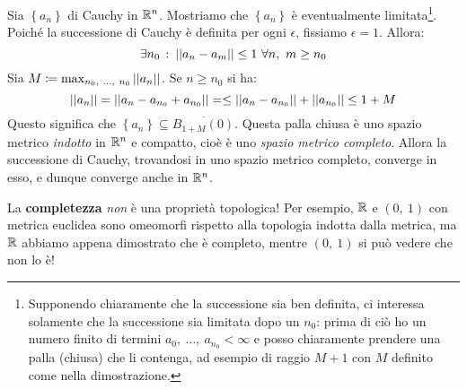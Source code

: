 \begin{demonstration}
	Sia $\left\{a_n\right\}$ di Cauchy in $\mathbb{R}^n$. Mostriamo che $\left\{a_n\right\}$ è eventualmente limitata\footnote{Supponendo chiaramente che la successione sia ben definita, ci interessa solamente che la successione sia limitata dopo un $n_0$: prima di ciò ho un numero finito di termini $a_0,\ \ldots,\ a_{n_0}<\infty$ e posso chiaramente prendere una palla (chiusa) che li contenga, ad esempio di raggio $M+1$ con $M$ definito come nella dimostrazione.}.\\
	Poiché la successione di Cauchy è definita per ogni $\epsilon$, fissiamo $\epsilon=1$. Allora:
	\begin{equation*}
	\exists n_0\ \colon \left|\left| a_n-a_m\right|\right|\leq 1\ \forall n,\ m\geq n_0
	\end{equation*}
Sia $M\coloneqq \max_{n_0,\ \ldots,\ n_0}\left|\left| a_n\right|\right|$. Se $n\geq n_0$ si ha:
\begin{equation*}
\left|\left| a_n\right|\right|=\left|\left| a_n - a_{n_0}+ a_{n_0}\right|\right|=\leq \left|\left| a_n - a_{n_0}\right|\right|+\left|\left| a_{n_0}\right|\right|\leq 1+M
\end{equation*}
Questo significa che $\left\{a_n\right\}\subseteq\overline{B_{1+M}\left(0\right)}$. Questa palla chiusa è uno spazio metrico \textit{indotto} in $\mathbb{R}^n$ e compatto, cioè è uno \textit{spazio metrico completo}. Allora la successione di Cauchy, trovandosi in uno spazio metrico completo, converge in esso, e dunque converge anche in $\mathbb{R}^n$.
\end{demonstration}
\begin{attention}
La \textbf{completezza} \textit{non} è una proprietà topologica! Per esempio, $\mathbb{R}$ e $\left(0,\ 1\right)$ con metrica euclidea sono omeomorfi rispetto alla topologia indotta dalla metrica, ma $\mathbb{R}$ abbiamo appena dimostrato che è completo, mentre $\left(0,\ 1\right)$ si può vedere che non lo è!
\end{attention}